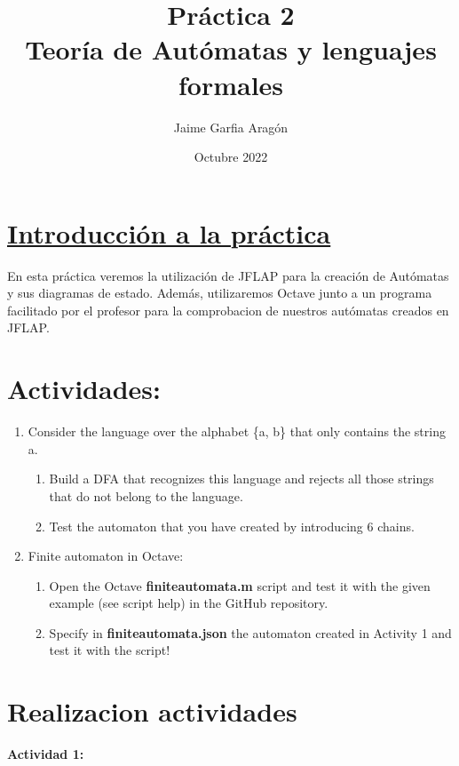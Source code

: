 \documentclass[titlepage,12pt]{article}
\title{\textbf{Práctica 2 \\ Teoría de Autómatas y lenguajes formales}}
\author{Jaime Garfia Aragón}
\date{Octubre 2022}
\begin{document}
\maketitle

\section*{\textbf{\underline{Introducción a la práctica}}}
En esta práctica veremos la utilización de JFLAP para la creación de Autómatas y 
sus diagramas de estado.
Además, utilizaremos Octave junto a un programa facilitado por el profesor para la comprobacion de nuestros autómatas creados en JFLAP.



\section*{\textbf{}{Actividades:}}

\begin{enumerate}
    \item Consider the language over the alphabet \{a, b\} that only contains the string a.
    \begin{enumerate}
        \item Build a DFA that recognizes this language and rejects all those strings that
do not belong to the language.
        \item Test the automaton that you have created by introducing 6 chains.
    \end{enumerate}
    
    \item Finite automaton in Octave:
    \begin{enumerate}
        \item Open the Octave \textbf{finiteautomata.m} script and test it with the given
example (see script help) in the GitHub repository.

        \item Specify in \textbf{finiteautomata.json} the automaton created in Activity 1
and test it with the script!




    \end{enumerate}

\end{enumerate}

\newpage
\section*{Realizacion actividades}
\textbf{Actividad 1:}
\end{document}
